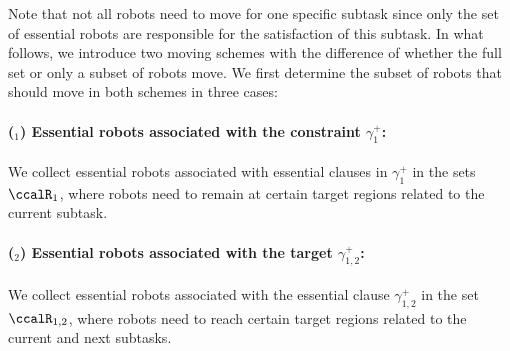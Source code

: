 \documentclass[Afour,sageh,times]{sagej}
\newcounter{mycounter}
\begin{document}
{{ Note that not all robots need to move for one specific subtask since only the set of essential robots are responsible for the satisfaction of this subtask. In what follows, we introduce two moving schemes with the difference of whether the full set or only a subset of robots move.   We first determine the subset of robots that should move in both schemes in three cases:
 \paragraph{($_1$) Essential robots associated with the constraint $\gamma_1^+$:}\label{sec:essential_a} We collect essential robots associated with essential clauses in $\gamma_{1}^{+}$ in the sets $\ccalR_{1}$,  where robots need to remain at certain target regions related to the current subtask.
 \paragraph{($_2$) Essential robots associated with the target $\gamma_{1,2}^{+}$:}\label{sec:essential_b}  We collect essential robots associated with the essential clause  $\gamma_{1,2}^{+}$ in the set $\ccalR_{1,2}$, where  robots need to reach certain target regions related to the current and next subtasks.
}}
\end{document}
